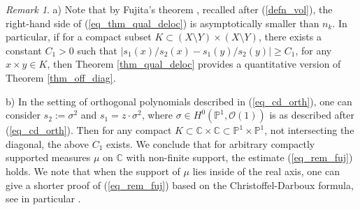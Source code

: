 \documentclass[12pt]{article}
\numberwithin{equation}{section}
\theoremstyle{theorem}
\theoremstyle{definition}
\theoremstyle{remark}
\newtheorem{rem}[thm]{Remark}
\newcommand{\comp}{\mathbb{C}}
\begin{document}
	\begin{rem}\label{rem_fuj}
		a) Note that by Fujita's theorem \cite{Fujita}, recalled after (\ref{defn_vol}), the right-hand side of (\ref{eq_thm_qual_deloc}) is asymptotically smaller than $n_k$.
		In particular, if for a compact subset $K \subset (X \setminus Y) \times (X \setminus Y)$, there exists a constant $C_1 > 0$ such that $| s_1(x)/s_2(x) - s_1(y)/s_2(y)| \geq C_1$, for any $x \times y \in K$, then Theorem \ref{thm_qual_deloc} provides a quantitative version of Theorem \ref{thm_off_diag}.
		\par 
		b)
		In the setting of orthogonal polynomials described in (\ref{eq_cd_orth}), one can consider $s_2 := \sigma^2$ and $s_1 = z \cdot \sigma^2$, where $\sigma \in H^0(\mathbb{P}^1, \mathscr{O}(1))$ is as described after (\ref{eq_cd_orth}).
		Then for any compact $K \subset \comp \times \comp \subset \mathbb{P}^1 \times \mathbb{P}^1$, not intersecting the diagonal, the above $C_1$ exists. 
		We conclude that for arbitrary compactly supported measures $\mu$ on $\comp$ with non-finite support, the estimate (\ref{eq_rem_fuj}) holds.
		We note that when the support of $\mu$ lies inside of the real axis, one can give a shorter proof of (\ref{eq_rem_fuj}) based on the Christoﬀel-Darboux formula, see in particular \cite[(2.13)]{NevaiCond}.
	\end{rem}
\end{document}
